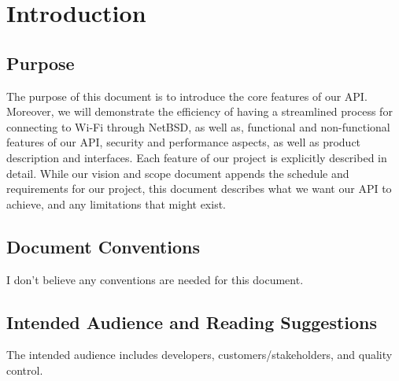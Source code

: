 \section{Introduction}

\subsection{Purpose}

The purpose of this document is to introduce the core features of our API. Moreover, we will demonstrate the efficiency 
of having a streamlined process for connecting to Wi-Fi through NetBSD, as well as, functional and non-functional features 
of our API, security and performance aspects, as well as product description and interfaces. Each feature of our project is 
explicitly described in detail. While our vision and scope document appends the schedule and requirements for our project, this 
document describes what we want our API to achieve, and any limitations that might exist. 

\subsection{Document Conventions}

I don't believe any conventions are needed for this document. 

\subsection{Intended Audience and Reading Suggestions}

The intended audience includes developers, customers/stakeholders, and quality control.

